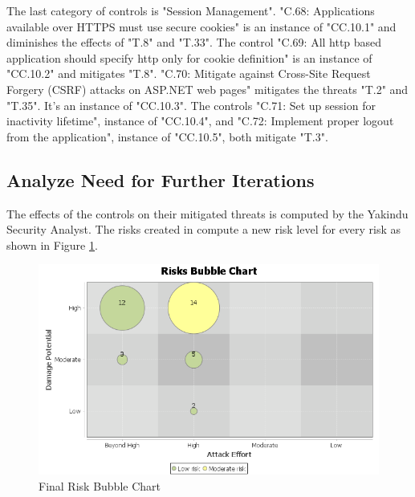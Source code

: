 \newline
The last category of controls is "Session Management". "C.68: Applications available over HTTPS must use secure cookies" is an instance of "CC.10.1" and diminishes the effects of "T.8" and "T.33". The control "C.69: All http based application should specify http only for cookie definition" is an instance of "CC.10.2" and mitigates "T.8". "C.70: Mitigate against Cross-Site Request Forgery (CSRF) attacks on ASP.NET web pages" mitigates the threats "T.2" and "T.35". It's an instance of "CC.10.3". The controls "C.71: Set up session for inactivity lifetime", instance of "CC.10.4", and "C.72: Implement proper logout from the application", instance of "CC.10.5", both mitigate "T.3". 


\subsection{Analyze Need for Further Iterations}

The effects of the controls on their mitigated threats is computed by the Yakindu Security Analyst. The risks created in \textit{} compute a new risk level for every risk as shown in Figure \ref{fig:bubblechart_p2}.

\begin{figure}[H]
  \includegraphics[width=\linewidth]{images/bubble_p2.png}
  \caption{Final Risk Bubble Chart}
  \label{fig:bubblechart_p2}
\end{figure}

